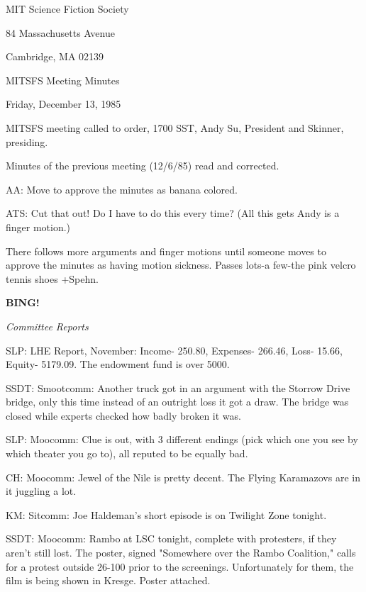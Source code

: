 \documentclass[12pt]{article}
\newcommand{\bing}{{\bf BING!} }
\newcommand{\goto}[1]{\bing \vskip 12pt \centerline{{\em{#1}}}}
\begin{document}
\begin{center}

MIT Science Fiction Society 

84 Massachusetts Avenue

Cambridge, MA 02139

\vspace{12pt}

MITSFS Meeting Minutes 

Friday, December 13, 1985

\end{center}
 
\vspace{18pt}

\setlength{\parskip}{6pt}

\noindent
MITSFS meeting called to order, 1700 SST,
Andy Su, President and Skinner, presiding.

Minutes of the previous meeting (12/6/85) read and corrected.

AA: Move to approve the minutes as banana colored.

ATS: Cut that out! Do I have to do this every time? (All this gets Andy is a finger motion.)

There follows more arguments and finger motions until someone moves to approve the minutes as having motion sickness. Passes lots-a few-the pink velcro tennis shoes +Spehn.

\goto{Committee Reports}

SLP: LHE Report, November: Income- 250.80, Expenses- 266.46, Loss- 15.66, Equity- 5179.09. The endowment fund is over 5000.

SSDT: Smootcomm: Another truck got in an argument with the Storrow Drive bridge, only this time instead of an outright loss it got a draw. The bridge was closed while experts checked how badly broken it was.

SLP: Moocomm: Clue is out, with 3 different endings (pick which one you see by which theater you go to), all reputed to be equally bad.

CH: Moocomm: Jewel of the Nile is pretty decent. The Flying Karamazovs are in it juggling a lot.

KM: Sitcomm: Joe Haldeman's short episode is on Twilight Zone tonight.

SSDT: Moocomm: Rambo at LSC tonight, complete with protesters, if they aren't still lost. The poster, signed "Somewhere over the Rambo Coalition," calls for a protest outside 26-100 prior to the screenings. Unfortunately for them, the film is being shown in Kresge. Poster attached.
\end{document}
